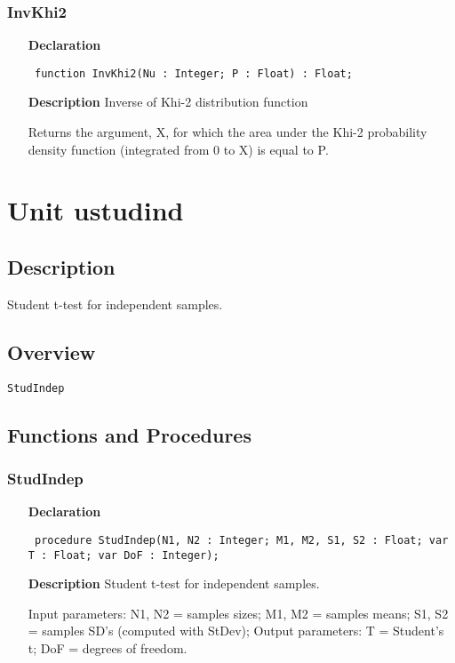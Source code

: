 \documentclass[12pt,a4paper,oneside]{report}
\newcommand{\declarationitem}[1]{\textbf{#1}}
\newcommand{\descriptiontitle}[1]{\textbf{#1}}
\newcommand{\code}[1]{\texttt{#1}}
\begin{document}
\subsubsection{InvKhi2}
\label{uinvgam-InvKhi2}
\begin{itemize}\item[\declarationitem{Declaration}\hfill]
	\begin{flushleft}
		\code{
			function InvKhi2(Nu : Integer; P : Float) : Float;}
	\end{flushleft}
	\item[\descriptiontitle{Description}]
	Inverse of Khi{-}2 distribution function
	
	Returns the argument, X, for which the area under the Khi{-}2 probability density function (integrated from 0 to X) is equal to P.
\end{itemize}

\section{Unit ustudind}
\label{ustudind}
\subsection{Description}
Student t{-}test for independent samples. \subsection{Overview}
\begin{description}
	\item[\texttt{StudIndep}]
\end{description}
\subsection{Functions and Procedures}
\subsubsection{StudIndep}
\label{ustudind-StudIndep}
\begin{itemize}\item[\declarationitem{Declaration}\hfill]
	\begin{flushleft}
		\code{
			procedure StudIndep(N1, N2 : Integer; M1, M2, S1, S2 : Float; var T : Float; var DoF : Integer);}
	\end{flushleft}
	\item[\descriptiontitle{Description}]
	Student t{-}test for independent samples.
	
	Input parameters: N1, N2 = samples sizes; M1, M2 = samples means; S1, S2 = samples SD's (computed with StDev); Output parameters: T = Student's t; DoF = degrees of freedom.
	
\end{itemize}
\end{document}
